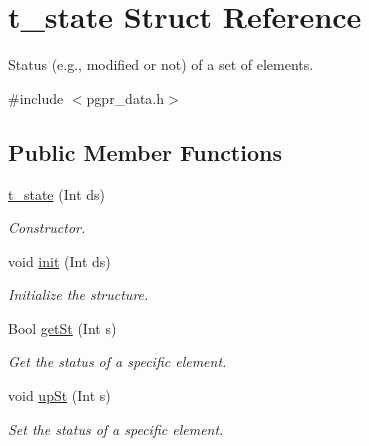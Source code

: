 \hypertarget{structt__state}{\section{t\-\_\-state Struct Reference}
\label{structt__state}
}


Status (e.\-g., modified or not) of a set of elements.  




{\ttfamily \#include $<$pgpr\-\_\-data.\-h$>$}

\subsection*{Public Member Functions}
\begin{DoxyCompactItemize}
\item 
\hyperlink{structt__state_a42c55e66207116e6e78283fd50414a1c}{t\-\_\-state} (Int ds)
\begin{DoxyCompactList}\small\item\em Constructor. \end{DoxyCompactList}\item 
void \hyperlink{structt__state_ac2e30425ac01de134c164fb1f2d11603}{init} (Int ds)
\begin{DoxyCompactList}\small\item\em Initialize the structure. \end{DoxyCompactList}\item 
Bool \hyperlink{structt__state_ac9637b03144741bb23da24c8ec61359b}{get\-St} (Int s)
\begin{DoxyCompactList}\small\item\em Get the status of a specific element. \end{DoxyCompactList}\item 
void \hyperlink{structt__state_ad627540f74cd0836ea8b32ec9dd1c299}{up\-St} (Int s)
\begin{DoxyCompactList}\small\item\em Set the status of a specific element. \end{DoxyCompactList}\end{DoxyCompactItemize}
